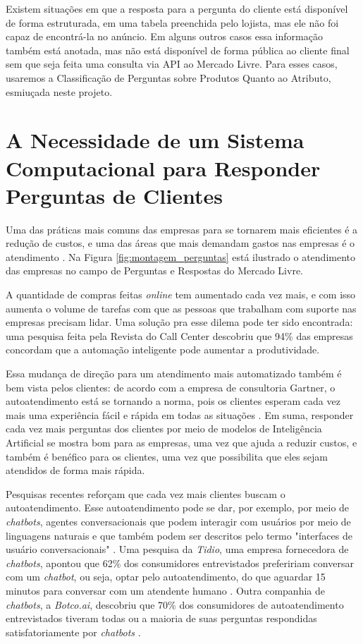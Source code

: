 Existem situações em que a resposta para a pergunta do cliente está disponível de forma estruturada, em uma tabela preenchida pelo lojista, mas ele não foi capaz de encontrá-la no anúncio. Em alguns outros casos essa informação também está anotada, mas não está disponível de forma pública ao cliente final sem que seja feita uma consulta via API ao Mercado Livre. Para esses casos, usaremos a Classificação de Perguntas sobre Produtos Quanto ao Atributo, esmiuçada neste projeto.

\section{A Necessidade de um Sistema Computacional para Responder Perguntas de Clientes}
\label{necessidade}
Uma das práticas mais comuns das empresas para se tornarem mais eficientes é a redução de custos, e uma das áreas que mais demandam gastos nas empresas é o atendimento \cite{reduzir_custos}. Na Figura \ref{fig:montagem_perguntas} está ilustrado o atendimento das empresas no campo de Perguntas e Respostas do Mercado Livre.

A quantidade de compras feitas \textit{online} tem aumentado cada vez mais, e com isso aumenta o volume de tarefas com que as pessoas que trabalham com suporte nas empresas precisam lidar. Uma solução pra esse dilema pode ter sido encontrada: uma pesquisa feita pela Revista do Call Center \cite{reduzir_custos} descobriu que 94\% das empresas concordam que a automação inteligente pode aumentar a produtividade.

Essa mudança de direção para um atendimento mais automatizado também é bem vista pelos clientes: de acordo com a empresa de consultoria Gartner, o autoatendimento está se tornando a norma, pois os clientes esperam cada vez mais uma experiência fácil e rápida em todas as situações \cite{ia_como_norma}. Em suma, responder cada vez mais perguntas dos clientes por meio de modelos de Inteligência Artificial se mostra bom para as empresas, uma vez que ajuda a reduzir custos, e também é benéfico para os clientes, uma vez que possibilita que eles sejam atendidos de forma mais rápida.

Pesquisas recentes reforçam que cada vez mais clientes buscam o autoatendimento. Esse autoatendimento pode se dar, por exemplo, por meio de \textit{chatbots}, agentes conversacionais que podem interagir com usuários por meio de linguagens naturais e que também podem ser descritos pelo termo "interfaces de usuário conversacionais" 
 \cite{chatbots_survey1}. Uma pesquisa da \textit{Tidio}, uma empresa fornecedora de \textit{chatbots}, apontou que 62\% dos consumidores entrevistados prefeririam conversar com um \textit{chatbot}, ou seja, optar pelo autoatendimento, do que aguardar 15 minutos para conversar com um atendente humano \cite{chatbots_survey2}. Outra companhia de \textit{chatbots}, a \textit{Botco.ai}, descobriu que 70\% dos consumidores de autoatendimento entrevistados tiveram todas ou a maioria de suas perguntas respondidas satisfatoriamente por \textit{chatbots} \cite{chatbots_survey3}.

